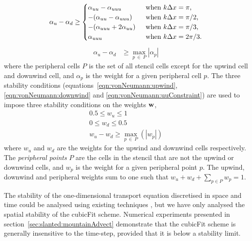 \begin{align}
\alpha_u - \alpha_d \geq 
\begin{cases}
	\alpha_{uu} - \alpha_{uuu} & \enskip \text{when $k \Delta x = \pi$,} \\
	- (\alpha_{uu} - \alpha_{uuu}) & \enskip \text{when $k \Delta x = \pi/2$,} \\
	- (\alpha_{uuu} + 2 \alpha_{uu}) & \enskip \text{when $k \Delta x = \pi/3$,} \\
	\alpha_{uuu} & \enskip \text{when $k \Delta x = 2\pi/3$.}
\end{cases} \label{eqn:vonNeumann:uuuConstraint}
\end{align}
\begin{align}
	\alpha_u - \alpha_d &\geq \max_{p\:\in\:P} |\alpha_p|
\end{align}
where the peripheral cells $P$ is the set of all stencil cells except for the upwind cell and downwind cell, and $\alpha_p$ is the weight for a given peripheral cell $p$.
The three stability conditions (equations~\ref{eqn:vonNeumann:upwind}, \ref{eqn:vonNeumann:downwind} and \ref{eqn:vonNeumann:uuConstraint}) are used to impose three stability conditions on the weights $\mathbf{w}$,
\begin{subequations}
\label{eqn:cubicFit:stability}
\begin{align}
	0.5 \leq w_u \leq 1 \label{eqn:cubicFit:stabilityU} \\
	0 \leq w_d \leq 0.5 \label{eqn:cubicFit:stabilityD} \\
	w_u - w_d \geq \max_{p\:\in\:P}(|w_p|)
\end{align}%
\end{subequations}
where $w_u$ and $w_d$ are the weights for the upwind and downwind cells respectively.  The \textit{peripheral points} $P$ are the cells in the stencil that are not the upwind or downwind cells, and $w_p$ is the weight for a given peripheral point $p$.
 The upwind, downwind and peripheral weights sum to one such that $w_u + w_d + \sum_{p \in P} w_p = 1$.

The stability of the one-dimensional transport equation discretised in space and time could be analysed using existing techniques \citep{baldauf2008}, but we have only analysed the spatial stability of the cubicFit scheme.  Numerical experiments presented in section~\ref{sec:slanted:mountainAdvect} demonstrate that the cubicFit scheme is generally insensitive to the time-step, provided that it is below a stability limit.

